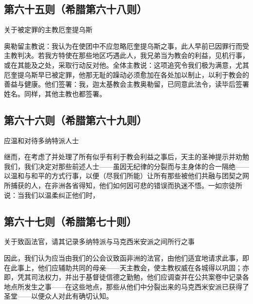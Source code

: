 
\subsection{第六十五则（希腊第六十八则）}

关于被定罪的主教厄奎提乌斯\par

奥勒留主教说：我认为在使团中不应忽略厄奎提乌斯之事，此人早前已因罪行而受主教判决。若我方特使在那些地区巧遇此人，我兄弟当为教会的利益，见机行事，或在其能及之处，采取行动反对他。全体主教说：这项追究令我们极为满意，尤其厄奎提乌斯早已被定罪，他那无耻的躁动必须愈加在各处加以制止，以利于教会的善益与健康。他们签署：我，迦太基教会主教奥勒留，已同意此法令，读毕后签署姓名。同样，其他主教也都签署。\par


\subsection{第六十六则（希腊第六十九则）}

应温和对待多纳特派人士\par

继而，在考虑了并处理了所有似乎有利于教会利益之事后，天主的圣神提示并劝勉我们，我们决定对那些前述人士——虽因无纪律的分裂而与主身体的合一隔绝——以温和与和平的方式行事，以便（尽我们所能）让所有那些被他们共融与团契之网所捕获的人，在非洲各省得知，他们如何因可悲的错误而执迷不悟。一如宗徒所说：当我们以温柔纠正他们时，\par


\subsection{第六十七则（希腊第七十则）}

关于致函法官，请其记录多纳特派与马克西米安派之间所行之事\par

因此，我们认为应当由我们的公会议致函非洲的法官，由他们适宜地请求此事，即在此事上，他们应辅助共同的母亲——天主教会，使主教权威在各城得以巩固；亦即，凭其司法权力，并出于基督徒信德之勤勉，他们应调查并在公共案卷中记录各地点所发生之事——在这些地点，那些从他们中分裂出来的马克西米安派已获得了圣堂——以便众人对此有确切认知。\par

